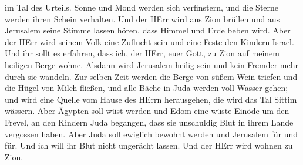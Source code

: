 im Tal des Urteils.  Sonne und Mond werden sich
verfinstern, und die Sterne werden ihren Schein verhalten. 
Und der HErr wird aus Zion brüllen und aus Jerusalem seine Stimme lassen
hören, dass Himmel und Erde beben wird. Aber der HErr wird seinem Volk
eine Zuflucht sein und eine Feste den Kindern Israel.  Und
ihr sollt es erfahren, dass ich, der HErr, euer Gott, zu Zion auf meinem
heiligen Berge wohne. Alsdann wird Jerusalem heilig sein und kein
Fremder mehr durch sie wandeln.  Zur selben Zeit werden die
Berge von süßem Wein triefen und die Hügel von Milch fließen, und alle
Bäche in Juda werden voll Wasser gehen; und wird eine Quelle vom Hause
des HErrn herausgehen, die wird das Tal Sittim wässern. 
Aber Ägypten soll wüst werden und Edom eine wüste Einöde um den Frevel,
an den Kindern Juda begangen, dass sie unschuldig Blut in ihrem Lande
vergossen haben.  Aber Juda soll ewiglich bewohnt werden
und Jerusalem für und für.  Und ich will ihr Blut nicht
ungerächt lassen. Und der HErr wird wohnen zu Zion.
